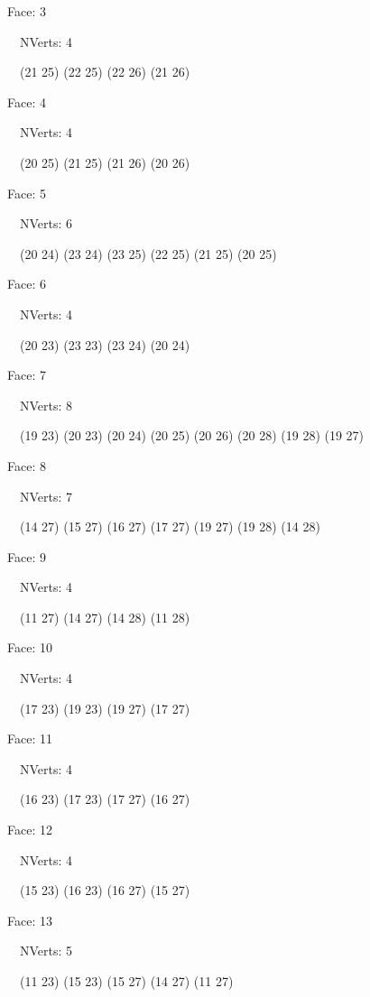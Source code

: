 \documentclass{article}
\begin{document}
{\footnotesize 

Face: 3

\   \    NVerts: 4

 \   \   (21 25) (22 25) (22 26) (21 26)}

{\footnotesize 

Face: 4

\   \    NVerts: 4

 \   \   (20 25) (21 25) (21 26) (20 26)}

{\footnotesize 

Face: 5

\   \    NVerts: 6

 \   \   (20 24) (23 24) (23 25) (22 25) (21 25) (20 25)}

{\footnotesize 

Face: 6

\   \    NVerts: 4

 \   \   (20 23) (23 23) (23 24) (20 24)}

{\footnotesize 

Face: 7

\   \    NVerts: 8

 \   \   (19 23) (20 23) (20 24) (20 25) (20 26) (20 28) (19 28) (19 27)}

{\footnotesize 

Face: 8

\   \    NVerts: 7

 \   \   (14 27) (15 27) (16 27) (17 27) (19 27) (19 28) (14 28)}

{\footnotesize 

Face: 9

\   \    NVerts: 4

 \   \   (11 27) (14 27) (14 28) (11 28)}

{\footnotesize 

Face: 10

\   \    NVerts: 4

 \   \   (17 23) (19 23) (19 27) (17 27)}

{\footnotesize 

Face: 11

\   \    NVerts: 4

 \   \   (16 23) (17 23) (17 27) (16 27)}

{\footnotesize 

Face: 12

\   \    NVerts: 4

 \   \   (15 23) (16 23) (16 27) (15 27)}

{\footnotesize 

Face: 13

\   \    NVerts: 5

 \   \   (11 23) (15 23) (15 27) (14 27) (11 27)}
\end{document}
